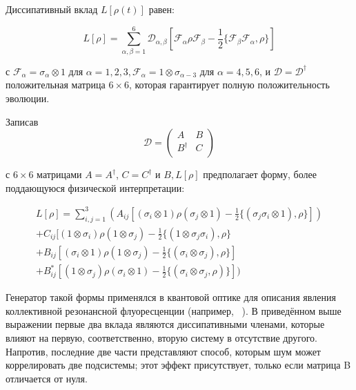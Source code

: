 \documentclass[11pt]{article}
\begin{document}
Диссипативный вклад $L[\rho(t)]$ равен:

\begin{equation}
L[\rho]=\sum\limits_{\alpha,\beta=1}^6 \mathscr{D}_{\alpha,\beta}[\mathscr{F}_\alpha \rho \mathscr{F}_\beta -
\frac{1}{2}\{ \mathscr{F}_\beta \mathscr{F}_\alpha, \rho \}
]
\label{eq_6}
\end{equation}

с $\mathscr{F}_\alpha = \sigma_{\alpha} \otimes 1$ для $\alpha = 1,2,3, \mathscr{F}_\alpha = 1 \otimes \sigma_{\alpha-3}$ для $\alpha=4,5,6$, и $\mathscr{D} = \mathscr{D}^†$ положительная матрица $6 \times 6$, которая гарантирует полную положительность эволюции.

Записав
\begin{equation}
\mathscr{D} = (
\begin{array}{cc}
	A & B \\
	B^† & C\\
\end{array}
)
\label{eq_7}
\end{equation}

с $6 \times 6$ матрицами  $A=A^†$, $C=C^†$ и $B, L[\rho]$ предполагает форму, более поддающуюся физической интерпретации:

\begin{equation}
\begin{gathered}
L[\rho]=\sum\limits_{i,j=1}^3(A_{ij}[(\sigma_i \otimes 1) \rho (\sigma_j \otimes 1)-\frac{1}{2}\{ (\sigma_j\sigma_i \otimes 1), \rho\}]) \\
+ C_{ij}[(1 \otimes \sigma_i) \rho (1 \otimes \sigma_j) -\frac{1}{2}\{(1 \otimes \sigma_j \sigma_i),\rho\} \\
+ B_{ij}[(\sigma_i \otimes 1)\rho (1 \otimes \sigma_j)-\frac{1}{2}\{ (\sigma_i \otimes \sigma_j), \rho\} ] \\
+ B_{ij}^{*}[(1 \otimes \sigma_j) \rho (\sigma_i \otimes 1) - \frac{1}{2}\{(\sigma_i \otimes \sigma_j, \rho) \} 
])
\end{gathered}
\label{eq_8}
\end{equation}

Генератор такой формы применялся в квантовой оптике для описания явления коллективной резонансной флуоресценции (например, ~\cite{b13}). 
В приведённом выше выражении первые два вклада являются диссипативными членами, которые влияют на первую, соответственно, вторую систему в отсутствие другого. Напротив, последние две части представляют способ, которым шум может коррелировать две подсистемы; этот эффект присутствует, только если матрица B отличается от нуля.
\end{document}

